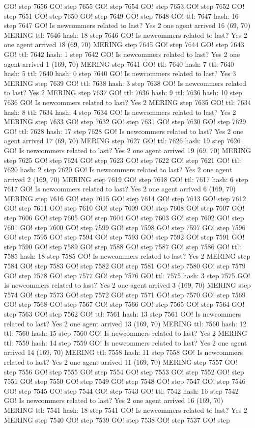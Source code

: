 GO! step 7656 GO! step 7655 GO! step 7654 GO! step 7653 GO! step 7652 GO! step 7651 GO! step 7650 GO! step 7649 GO! step 7648 GO! ttl: 7647 hash: 16 step 7647 GO! Is newcommers related to last? Yes 2 one agent arrived 16 (69, 70) MERING ttl: 7646 hash: 18 step 7646 GO! Is newcommers related to last? Yes 2 one agent arrived 18 (69, 70) MERING step 7645 GO! step 7644 GO! step 7643 GO! ttl: 7642 hash: 1 step 7642 GO! Is newcommers related to last? Yes 2 one agent arrived 1 (169, 70) MERING step 7641 GO! ttl: 7640 hash: 7 ttl: 7640 hash: 5 ttl: 7640 hash: 0 step 7640 GO! Is newcommers related to last? Yes 3 MERING step 7639 GO! ttl: 7638 hash: 3 step 7638 GO! Is newcommers related to last? Yes 2 MERING step 7637 GO! ttl: 7636 hash: 9 ttl: 7636 hash: 10 step 7636 GO! Is newcommers related to last? Yes 2 MERING step 7635 GO! ttl: 7634 hash: 8 ttl: 7634 hash: 4 step 7634 GO! Is newcommers related to last? Yes 2 MERING step 7633 GO! step 7632 GO! step 7631 GO! step 7630 GO! step 7629 GO! ttl: 7628 hash: 17 step 7628 GO! Is newcommers related to last? Yes 2 one agent arrived 17 (69, 70) MERING step 7627 GO! ttl: 7626 hash: 19 step 7626 GO! Is newcommers related to last? Yes 2 one agent arrived 19 (69, 70) MERING step 7625 GO! step 7624 GO! step 7623 GO! step 7622 GO! step 7621 GO! ttl: 7620 hash: 2 step 7620 GO! Is newcommers related to last? Yes 2 one agent arrived 2 (169, 70) MERING step 7619 GO! step 7618 GO! ttl: 7617 hash: 6 step 7617 GO! Is newcommers related to last? Yes 2 one agent arrived 6 (169, 70) MERING step 7616 GO! step 7615 GO! step 7614 GO! step 7613 GO! step 7612 GO! step 7611 GO! step 7610 GO! step 7609 GO! step 7608 GO! step 7607 GO! step 7606 GO! step 7605 GO! step 7604 GO! step 7603 GO! step 7602 GO! step 7601 GO! step 7600 GO! step 7599 GO! step 7598 GO! step 7597 GO! step 7596 GO! step 7595 GO! step 7594 GO! step 7593 GO! step 7592 GO! step 7591 GO! step 7590 GO! step 7589 GO! step 7588 GO! step 7587 GO! step 7586 GO! ttl: 7585 hash: 18 step 7585 GO! Is newcommers related to last? Yes 2 MERING step 7584 GO! step 7583 GO! step 7582 GO! step 7581 GO! step 7580 GO! step 7579 GO! step 7578 GO! step 7577 GO! step 7576 GO! ttl: 7575 hash: 3 step 7575 GO! Is newcommers related to last? Yes 2 one agent arrived 3 (169, 70) MERING step 7574 GO! step 7573 GO! step 7572 GO! step 7571 GO! step 7570 GO! step 7569 GO! step 7568 GO! step 7567 GO! step 7566 GO! step 7565 GO! step 7564 GO! step 7563 GO! step 7562 GO! ttl: 7561 hash: 13 step 7561 GO! Is newcommers related to last? Yes 2 one agent arrived 13 (169, 70) MERING ttl: 7560 hash: 12 ttl: 7560 hash: 15 step 7560 GO! Is newcommers related to last? Yes 2 MERING ttl: 7559 hash: 14 step 7559 GO! Is newcommers related to last? Yes 2 one agent arrived 14 (169, 70) MERING ttl: 7558 hash: 11 step 7558 GO! Is newcommers related to last? Yes 2 one agent arrived 11 (169, 70) MERING step 7557 GO! step 7556 GO! step 7555 GO! step 7554 GO! step 7553 GO! step 7552 GO! step 7551 GO! step 7550 GO! step 7549 GO! step 7548 GO! step 7547 GO! step 7546 GO! step 7545 GO! step 7544 GO! step 7543 GO! ttl: 7542 hash: 16 step 7542 GO! Is newcommers related to last? Yes 2 one agent arrived 16 (169, 70) MERING ttl: 7541 hash: 18 step 7541 GO! Is newcommers related to last? Yes 2 MERING step 7540 GO! step 7539 GO! step 7538 GO! step 7537 GO! step 